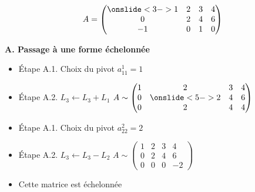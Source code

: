 \begin{frame}
\vspace*{-3ex}
$$A=\begin{pmatrix}
\mathinsist<3->{1}&2&3&4\\
0&2&4&6\\
-1&0&1&0
\end{pmatrix}$$

\pause
\textbf{A. Passage à une forme échelonnée}

\pause

\begin{itemize}[<+->]
  \item \'Etape A.1. Choix du pivot $a_{11}^1=1$
  
  \item \'Etape A.2. $L_3 \leftarrow L_3 + L_1$
  \hfil
$A\sim\begin{pmatrix}1&2&3&4\\
0& \mathinsist<5->{2} &4&6\\
0&2&4&4
\end{pmatrix}$

  \item \'Etape A.1. Choix du pivot $a^2_{22}=2$
  
  \item \'Etape A.2. $L_3 \leftarrow L_3 - L_2$
\hfil   $A\sim\begin{pmatrix}1&2&3&4\\
0&2&4&6\\
0&0&0&-2
\end{pmatrix}$

  \item Cette matrice est échelonnée
\end{itemize}

\end{frame}


